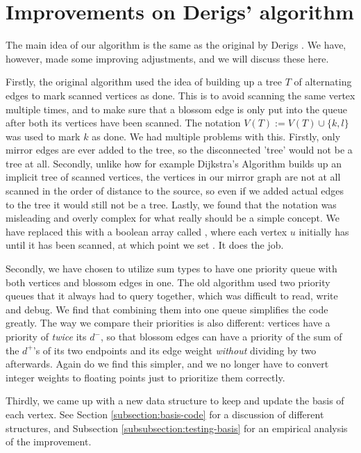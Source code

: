\section{Improvements on Derigs' algorithm}
The main idea of our algorithm is the same as the original by Derigs \cite{source:derigs_shortest_odd_path}. We have, however, made some improving adjustments, and we will discuss these here.

Firstly, the original algorithm used the idea of building up a tree $T$ of alternating edges to mark scanned vertices as done. This is to avoid scanning the same vertex multiple times, and to make sure that a blossom edge is only put into the queue after both its vertices have been scanned. The notation $V(T) := V(T) \cup \{k,l\}$ was used to mark $k$ as done. We had multiple problems with this. Firstly, only mirror edges are ever added to the tree, so the disconnected 'tree' would not be a tree at all. Secondly, unlike how for example Dijkstra's Algorithm builds up an implicit tree of scanned vertices, the vertices in our mirror graph are not at all scanned in the order of distance to the source, so even if we added actual edges to the tree it would still not be a tree. Lastly, we found that the notation was misleading and overly complex for what really should be a simple concept. We have replaced this with a boolean array called , where each vertex $u$ initially has  until it has been scanned, at which point we set . It does the job.

Secondly, we have chosen to utilize sum types to have one priority queue with both vertices and blossom edges in one. The old algorithm used two priority queues that it always had to query together, which was difficult to read, write and debug. We find that combining them into one queue simplifies the code greatly. The way we compare their priorities is also different: vertices have a priority of \emph{twice} its $d^-$, so that blossom edges can have a priority of the sum of the $d^+$'s of its two endpoints and its edge weight \emph{without} dividing by two afterwards. Again do we find this simpler, and we no longer have to convert integer weights to floating points just to prioritize them correctly.

Thirdly, we came up with a new data structure to keep and update the basis of each vertex. See Section \ref{subsection:basis-code} for a discussion of different structures, and Subsection \ref{subsubsection:testing-basis} for an empirical analysis of the improvement.
